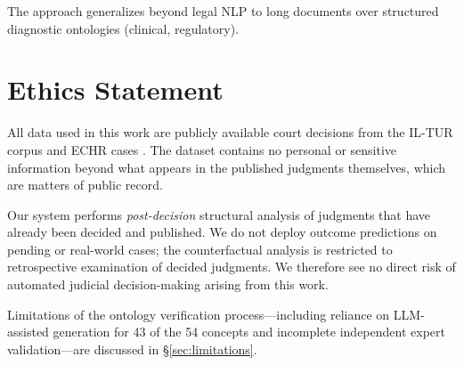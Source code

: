 \documentclass[11pt]{article}
\begin{document}
The approach generalizes beyond legal NLP to long documents over structured diagnostic ontologies (clinical, regulatory).

\section*{Ethics Statement}

All data used in this work are publicly available court decisions from the IL-TUR corpus \citep{joshi2024iltur} and ECHR cases \citep{chalkidis2019neural}. The dataset contains no personal or sensitive information beyond what appears in the published judgments themselves, which are matters of public record.

Our system performs \emph{post-decision} structural analysis of judgments that have already been decided and published. We do not deploy outcome predictions on pending or real-world cases; the counterfactual analysis is restricted to retrospective examination of decided judgments. We therefore see no direct risk of automated judicial decision-making arising from this work.

Limitations of the ontology verification process---including reliance on LLM-assisted generation for 43 of the 54 concepts and incomplete independent expert validation---are discussed in \S\ref{sec:limitations}.

\end{document}
